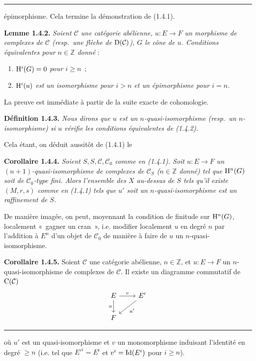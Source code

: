 \documentclass[11pt]{article}
\begin{document}
\medskip\hrule\medskip

épimorphisme. Cela termine la démonstration de (1.4.1).

\textbf{Lemme 1.4.2.} \emph{Soient \(\mathcal C\) une catégorie abélienne, \(u:E\to F\) un morphisme de complexes de \(\mathcal C\) (resp.\ une flèche de \(\mathrm D(\mathcal C)\)), \(G\) le cône de \(u\). Conditions équivalentes pour \(n\in\mathbb Z\) donné} :
\begin{enumerate}[label=(\roman*)]
\item \emph{\(\mathrm H^i(G)=0\) pour \(i\geq n\)}~;
\item \emph{\(\mathrm H^i(u)\) est un isomorphisme pour \(i>n\) et un épimorphisme pour \(i=n\)}.
\end{enumerate}
La preuve est immédiate à partir de la suite exacte de cohomologie.

\textbf{Définition 1.4.3.} \emph{Nous dirons que \(u\) est un \(n\)-quasi-isomorphisme (resp.\ un \(n\)-isomorphisme) si \(u\) vérifie les conditions équivalentes de (1.4.2).}

Cela étant, on déduit aussitôt de (1.4.1) le

\textbf{Corollaire 1.4.4.} \emph{Soient \(S,S,\mathcal C,\mathcal C_0\) comme en (1.4.1). Soit \(u:E\to F\) un \((n+1)\)-quasi-isomorphisme de complexes de \(\mathcal C_S\) (\(n\in\mathbb Z\) donné) tel que \(\mathrm H^n(G)\) soit de \(\mathcal C_0\)-type fini. Alors l'ensemble des \(X\) au-dessus de \(S\) tels qu'il existe \((M,r,s)\) comme en (1.4.1) tels que \(u'\) soit un \(n\)-quasi-isomorphisme est un raffinement de \(S\).}

De manière imagée, on peut, moyennant la condition de finitude sur \(\mathrm H^n(G)\), localement «~gagner un cran~», i.e. modifier localement \(u\) en degré \(n\) par l'addition à \(E^n\) d'un objet de \(\mathcal C_0\) de manière à faire de \(u\) un \(n\)-quasi-isomorphisme.

\textbf{Corollaire 1.4.5.} Soient \(\mathcal C\) une catégorie abélienne, \(n\in\mathbb Z\), et \(u:E\to F\) un \(n\)-quasi-isomorphisme de complexes de \(\mathcal C\). Il existe un diagramme commutatif de \(\mathrm C(\mathcal C)\)
\[
\begin{tikzcd}
E \arrow[r,"v"] \arrow[d,"u"'] & E' \arrow[dl,"u'"]\\
F &
\end{tikzcd}
\]


\medskip\hrule\medskip

où \(u'\) est un
quasi-isomorphisme et \(v\) un monomorphisme induisant l'identité en degré \(\geq n\) (i.e. tel que \(E'^i=E^i\) et \(v^i=\operatorname{Id}(E^i)\) pour \(i\geq n\)).
\end{document}
